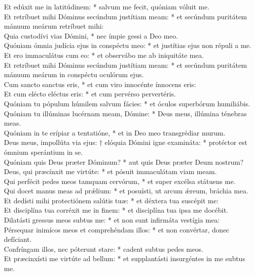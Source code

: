 {	Et edúxit me in latitúdinem: * salvum me fecit, quóniam vóluit me. \\
	Et retríbuet mihi Dóminus secúndum justítiam meam: * et secúndum puritátem mánuum meárum retríbuet mihi: \\
	Quia custodívi vias Dómini, * nec ímpie gessi a Deo meo. \\
	Quóniam ómnia judícia ejus in conspéctu meo: * et justítias ejus non répuli a me. \\
	Et ero immaculátus cum eo: * et observábo me ab iniquitáte mea. \\
	Et retríbuet mihi Dóminus secúndum justítiam meam: * et secúndum puritátem mánuum meárum in conspéctu oculórum ejus. \\
	Cum sancto sanctus eris, * et cum viro innocénte ínnocens eris: \\
	Et cum elécto eléctus eris: * et cum pervérso pervertéris. \\
	Quóniam tu pópulum húmilem salvum fácies: * et óculos superbórum humiliábis. \\
	Quóniam tu illúminas lucérnam meam, Dómine: * Deus meus, illúmina ténebras meas. \\
	Quóniam in te erípiar a tentatióne, * et in Deo meo transgrédiar murum. \\
	Deus meus, impollúta via ejus: † elóquia Dómini igne examináta: * protéctor est ómnium sperántium in se. \\
	Quóniam quis Deus præter Dóminum? * aut quis Deus præter Deum nostrum? \\
	Deus, qui præcínxit me virtúte: * et pósuit immaculátam viam meam. \\
	Qui perfécit pedes meos tamquam cervórum, * et super excélsa státuens me. \\
	Qui docet manus meas ad prǽlium: * et posuísti, ut arcum ǽreum, bráchia mea. \\
	Et dedísti mihi protectiónem salútis tuæ: * et déxtera tua suscépit me: \\
	Et disciplína tua corréxit me in finem: * et disciplína tua ipsa me docébit. \\
	Dilatásti gressus meos subtus me: * et non sunt infirmáta vestígia mea: \\
	Pérsequar inimícos meos et comprehéndam illos: * et non convértar, donec defíciant. \\
	Confríngam illos, nec póterunt stare: * cadent subtus pedes meos. \\
	Et præcinxísti me virtúte ad bellum: * et supplantásti insurgéntes in me subtus me. \\
}
